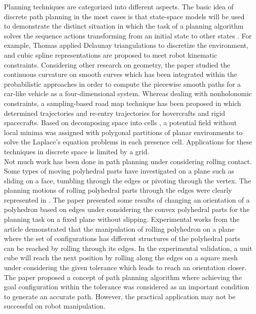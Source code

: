 \noindent Planning techniques are categorized into different aspects. The basic idea of discrete path planning in the most cases is that state-space models will be used to demonstrate the distinct situation in which the task of a planning algorithm solves the sequence actions transforming from an initial state to other states \cite{Lavalle98rapidly_exploringrandom}. For example, Thomas \cite{Thomas_2003_Trajectory} applied Delaunay triangulations to discretize the environment, and cubic spline representations are proposed to meet robot kinematic constraints.
Considering other research on geometry, the paper \cite{Lamiraux_2001_Smooth_MP} studied the continuous curvature on smooth curves which has been integrated within the probabilistic approaches in order to compute the piecewise smooth paths for a car-like vehicle as a four-dimensional system. Whereas dealing with nonholonomic constraints, a sampling-based road map technique has been proposed in \cite{Cheng01_RRT-BasedTrajectory} which determined trajectories and re-entry trajectories for hovercrafts and rigid spacecrafts. Based on decomposing space into cells \cite{Conner03_LocalFunction_Nagivation}, a potential field without local minima was assigned with polygonal partitions of planar environments to solve the Laplace’s equation problems in each presence cell. Applications for these techniques in discrete space is limited by a grid.\\

\noindent Not much work has been done in path planning under considering rolling contact. Some types of moving polyhedral parts have investigated on a plane such as sliding on a face, tumbling through the edges or pivoting \cite{Aiyama93_Pivoting} through the vertex. The planning motions of rolling polyhedral parts through the edges were clearly represented in \cite{Marigo97_PolyhedraManipulation_rolling}. The paper presented some results of changing an orientation of a polyhedron based on edges under considering the convex polyhedral parts for the planning task on a fixed plane without slipping. Experimental works from the article demonstrated that the manipulation of rolling polyhedron on a plane where the set of configurations has different structures of the polyhedral parts can be reached by rolling through its edges. In the experimental validation, a unit cube will reach the next position by rolling  along the edges on a square mesh under considering the given tolerance which leads to reach an orientation closer. The paper proposed a concept of path planning algorithm where achieving the goal configuration within the tolerance was considered as an important condition to generate an accurate path. However, the practical application may not be successful on robot manipulation.\\

